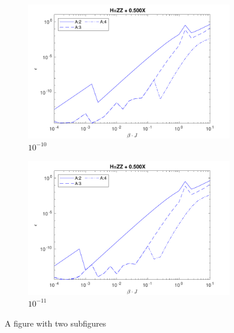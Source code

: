 \begin{figure}
    \centering
    \begin{subfigure}{\textwidth}
        \centering
        \includegraphics[width=0.8\linewidth]{Figuren/mpo_construction/sigm0/e10.pdf}
        \caption{ ${10}^{-10}$}
        \label{fig:sub1}
    \end{subfigure}%

    \begin{subfigure}{\textwidth}
        \centering
        \includegraphics[width=0.8\linewidth]{Figuren/mpo_construction/sigm0/e11.pdf}
        \caption{${10}^{-11}$}
        \label{fig:sub2}
    \end{subfigure}
    \caption{A figure with two subfigures}
    \label{fig:sigman0}
\end{figure}



